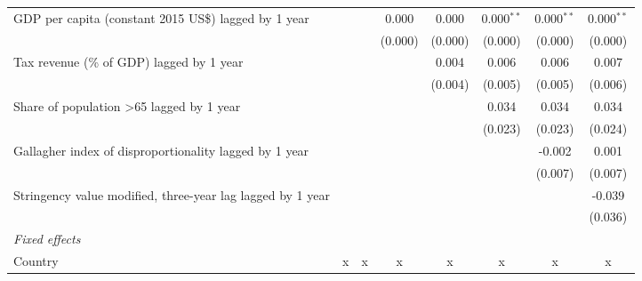 \begin{tabular}{lccccccc}
   GDP per capita (constant 2015 US\$) lagged by 1 year                                             &              &              & 0.000        & 0.000        & 0.000$^{**}$ & 0.000$^{**}$ & 0.000$^{**}$\\   
                                                                                                    &              &              & (0.000)      & (0.000)      & (0.000)      & (0.000)      & (0.000)\\   
   Tax revenue (\% of GDP) lagged by 1 year                                                         &              &              &              & 0.004        & 0.006        & 0.006        & 0.007\\   
                                                                                                    &              &              &              & (0.004)      & (0.005)      & (0.005)      & (0.006)\\   
   Share of population >65 lagged by 1 year                                                         &              &              &              &              & 0.034        & 0.034        & 0.034\\   
                                                                                                    &              &              &              &              & (0.023)      & (0.023)      & (0.024)\\   
   Gallagher index of disproportionality lagged by 1 year                                           &              &              &              &              &              & -0.002       & 0.001\\   
                                                                                                    &              &              &              &              &              & (0.007)      & (0.007)\\   
   Stringency value modified, three-year lag lagged by 1 year                                       &              &              &              &              &              &              & -0.039\\   
                                                                                                    &              &              &              &              &              &              & (0.036)\\   
   \emph{Fixed effects}\\
   Country                                                                                          & x            & x            & x            & x            & x            & x            & x\\  

\end{tabular}
